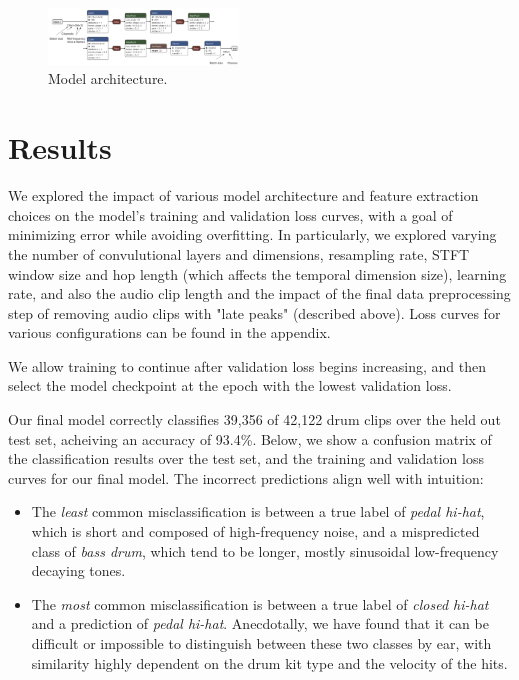 \documentclass[twocolumn]{article}
\begin{document}
\begin{figure}
\centering
\includegraphics[width=0.45\textwidth]{figures/model_architecture.png}
\caption{Model architecture.}
\label{fig:model_architecture}
\end{figure}

\section{Results}

We explored the impact of various model architecture and feature extraction choices on the model's training and validation loss curves, with a goal of minimizing error while avoiding overfitting.
In particularly, we explored varying the number of convulutional layers and dimensions, resampling rate, STFT window size and hop length (which affects the temporal dimension size), learning rate, and also the audio clip length and the impact of the final data preprocessing step of removing audio clips with "late peaks" (described above).
Loss curves for various configurations can be found in the appendix.

We allow training to continue after validation loss begins increasing, and then select the model checkpoint at the epoch with the lowest validation loss.

Our final model correctly classifies 39,356 of 42,122 drum clips over the held out test set, acheiving an accuracy of 93.4\%.
Below, we show a confusion matrix of the classification results over the test set, and the training and validation loss curves for our final model.
The incorrect predictions align well with intuition:
\begin{itemize}
\item The \textit{least} common misclassification is between a true label of \textit{pedal hi-hat}, which is short and composed of high-frequency noise, and a mispredicted class of \textit{bass drum}, which tend to be longer, mostly sinusoidal low-frequency decaying tones.
\item The \textit{most} common misclassification is between a true label of \textit{closed hi-hat} and a prediction of \textit{pedal hi-hat}.
      Anecdotally, we have found that it can be difficult or impossible to distinguish between these two classes by ear, with similarity highly dependent on the drum kit type and the velocity of the hits.
\end{itemize}
\end{document}
